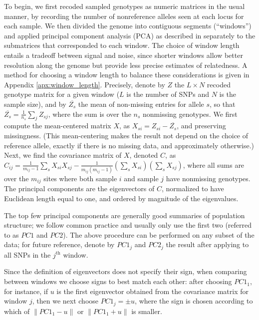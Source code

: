 \documentclass[11pt, oneside]{article}   	%
\newcommand\citet{\cite}
\newcommand{\pcone}{PC1}
\newcommand{\pctwo}{PC2}
\begin{document}
To begin,
we first recoded sampled genotypes as numeric matrices in the usual manner,
by recording the number of nonreference alleles seen at each locus for each sample.
We then divided the genome into contiguous segments 
(``windows'')
and applied principal component analysis (PCA) as described in \citet{mcvean2009genealogical}
separately to the submatrices that corresponded to each window.
The choice of window length entails a tradeoff between signal and noise,
since shorter windows allow better resolution along the genome but provide less precise estimates of relatedness.
A method for choosing a window length to balance these considerations is given in Appendix \ref{apx:window_length}.
Precisely,
denote by $Z$ the $L\times N$ recoded genotype matrix for a given window ($L$ is the number of SNPs and $N$ is the sample size), 
and by $\overline{Z_{s}}$ the mean of non-missing entries for allele $s$, 
so that $\overline{Z_{s}}=\frac{1}{n_s}\sum_j Z_{sj}$, 
where the sum is over the $n_s$ nonmissing genotypes.
We first compute the mean-centered matrix $X$, as $X_{si}=Z_{si}-\overline{Z_{s}}$,
and preserving missingness.
(This mean-centering makes the result not depend on the choice of reference allele,
exactly if there is no missing data, and approximately otherwise.)
Next, we find the covariance matrix of $X$, denoted $C$,
as $C_{ij} = \frac{1}{m_{ij}-1} \sum_s X_{si} X_{sj} - \frac{1}{m_{ij}(m_{ij}-1)} (\sum_s X_{si})(\sum_s X_{sj})$,
where all sums are over the $m_{ij}$ sites where both sample $i$ and sample $j$ have nonmissing genotypes.
The principal components are the eigenvectors of $C$, 
normalized to have Euclidean length equal to one,
and ordered by magnitude of the eigenvalues.

The top few principal components are generally good summaries of population structure; 
we follow common practice and usually only use the first two (referred to as $\pcone$ and $\pctwo$).
The above procedure can be performed on any subset of the data;
for future reference, denote by $\pcone_j$ and $\pctwo_j$
the result after applying to all SNPs in the $j^\text{th}$ window.

Since the definition of eigenvectors does not specify their sign,
when comparing between windows we choose signs to best match each other:
after choosing $\pcone_1$, for instance, 
if $u$ is the first eigenvector obtained from the covariance matrix
for window $j$,
then we next choose $\pcone_j = \pm u$,
where the sign is chosen according to which of 
$\| \pcone_{1} - u \|$ or
$\| \pcone_{1} + u \|$ 
is smaller.
\end{document}
